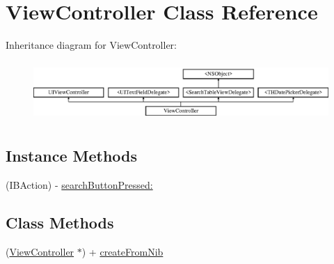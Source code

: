 \hypertarget{interface_view_controller}{}\section{View\+Controller Class Reference}
\label{interface_view_controller}
Inheritance diagram for View\+Controller\+:\begin{figure}[H]
\begin{center}
\leavevmode
\includegraphics[height=2.282609cm]{interface_view_controller}
\end{center}
\end{figure}
\subsection*{Instance Methods}
\begin{DoxyCompactItemize}
\item 
(I\+B\+Action) -\/ \hyperlink{interface_view_controller_a81c9d82a129c7860998363641af5c14a}{search\+Button\+Pressed\+:}
\end{DoxyCompactItemize}
\subsection*{Class Methods}
\begin{DoxyCompactItemize}
\item 
(\hyperlink{interface_view_controller}{View\+Controller} $\ast$) + \hyperlink{interface_view_controller_aa047ad5062ff1133373614f651f15a22}{create\+From\+Nib}
\end{DoxyCompactItemize}
